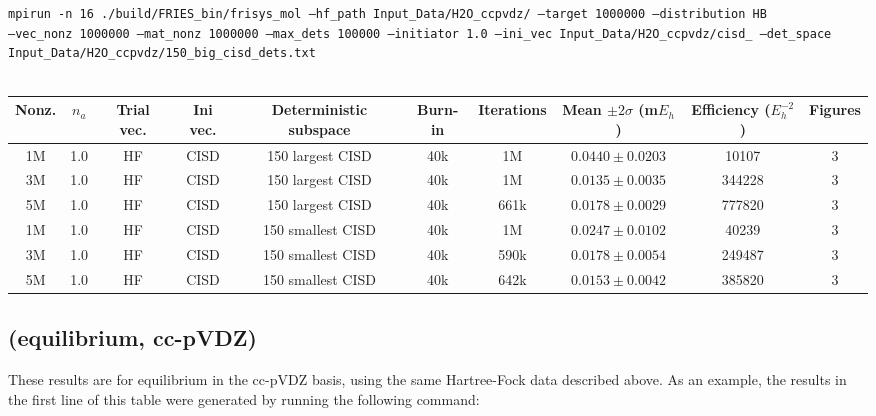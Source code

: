 \documentclass[12pt, landscape]{article}
\begin{document}
\texttt{mpirun -n 16 ./build/FRIES\_bin/frisys\_mol --hf\_path Input\_Data/H2O\_ccpvdz/ --target 1000000 --distribution HB}\\ \texttt{--vec\_nonz 1000000 --mat\_nonz 1000000 --max\_dets 100000 --initiator 1.0 --ini\_vec Input\_Data/H2O\_ccpvdz/cisd\_ --det\_space Input\_Data/H2O\_ccpvdz/150\_big\_cisd\_dets.txt}
\\~\\
\begin{tabular}{c|c|c|c|c|c|c|c|c|c}
Nonz. & $n_a$ & Trial vec. & Ini vec. & Deterministic subspace & Burn-in & Iterations & Mean $\pm 2 \sigma$ (m$E_h$) & Efficiency ($E_h^{-2}$) & Figures \\ \hline
1M & 1.0 & HF & CISD & 150 largest CISD & 40k & 1M & $0.0440 \pm 0.0203$ & 10107 & 3 \\
3M & 1.0 & HF & CISD & 150 largest CISD & 40k & 1M & $0.0135 \pm 0.0035$ & 344228 & 3 \\
5M & 1.0 & HF & CISD & 150 largest CISD & 40k & 661k & $0.0178 \pm 0.0029$ & 777820 & 3 \\
1M & 1.0 & HF & CISD & 150 smallest CISD & 40k & 1M & $0.0247 \pm 0.0102$ & 40239 & 3 \\
3M & 1.0 & HF & CISD & 150 smallest CISD & 40k & 590k & $0.0178 \pm 0.0054$ & 249487 & 3 \\
5M & 1.0 & HF & CISD & 150 smallest CISD & 40k & 642k & $0.0153 \pm 0.0042$ & 385820 & 3 \\
\end{tabular}


\subsection*{ (equilibrium, cc-pVDZ)}
These results are for equilibrium  in the cc-pVDZ basis, using the same Hartree-Fock data described above. As an example, the results in the first line of this table were generated by running the following command:
\end{document}
